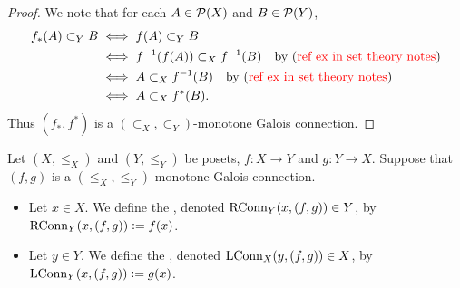 \documentclass{book}
\begin{document}
	\begin{proof}
		We note that for each $A \in \mathcal{P}(X)$ and $B \in \mathcal{P}(Y)$, 
		\begin{align*}
			f_*(A) \subset_Y B 
			& \iff f(A) \subset_Y B \\
			& \iff f^{-1}(f(A)) \subset_X f^{-1}(B) \quad \text{by (\textcolor{red}{ref ex in set theory notes})} \\
			& \iff A \subset_X f^{-1}(B) \quad \text{by (\textcolor{red}{ref ex in set theory notes})} \\ 
			& \iff A \subset_X f^*(B). 
		\end{align*}
		Thus $(f_*, f^*)$ is a $(\subset_X, \subset_Y)$-monotone Galois connection.
	\end{proof}
	
	
	
	
	
	
	
	
	
	
	
	
	
	\begin{defn} 
		Let $(X, \leq_X)$ and $(Y, \leq_Y)$ be posets, $f: X \rightarrow Y$ and $g:Y \rightarrow X$. Suppose that $(f,g)$ is a $(\leq_X, \leq_Y)$-monotone Galois connection. 
		\begin{itemize}
			\item Let $x \in X$. We define the , denoted $\operatorname{RConn}_Y(x, (f,g)) \in Y$, by $\operatorname{RConn}_Y(x, (f,g)) \vcentcolon= f(x)$. 
			\item Let $y \in Y$. We define the , denoted $\operatorname{LConn}_X(y, (f,g)) \in X$, by $\operatorname{LConn}_Y(x, (f,g)) \vcentcolon= g(x)$.
		\end{itemize}
	\end{defn}
	
	
	
	
	
	
	
	
	
	
	
	
	
	
	
	
	
	
	
	
	
	
	
	
	
	
	
\end{document}
